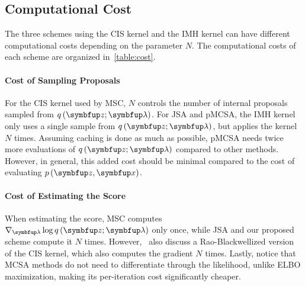 \begin{wraptable}{r}{0.55\textwidth}
  \centering
  \vspace{-0.5in}
  
  \vspace{-0.2in}
\end{wraptable}
%
\vspace{-0.05in}
\subsection{Computational Cost}
\vspace{-0.05in}
The three schemes using the CIS kernel and the IMH kernel can have different computational costs depending on the parameter \(N\).
The computational costs of each scheme are organized in~\cref{table:cost}.

\vspace{-0.1in}
\paragraph{Cost of Sampling Proposals}
For the CIS kernel used by MSC, \(N\) controls the number of internal proposals sampled from \(q\,(\vz; \vlambda)\).
For JSA and pMCSA, the IMH kernel only uses a single sample from \(q\,(\vz; \vlambda)\), but applies the kernel \(N\) times.
Assuming caching is done as much as possible, pMCSA needs twice more evaluations of \(q\,(\vz; \vlambda)\) compared to other methods.
However, in general, this added cost should be minimal compared to the cost of evaluating \(p\,(\vz,\vx)\).

\vspace{-0.1in}
\paragraph{Cost of Estimating the Score}
When estimating the score, MSC computes \(\nabla_{\vlambda} \log q\,(\vz; \vlambda)\) only once, while JSA and our proposed scheme compute it \(N\) times.
However,~\cite{NEURIPS2020_b2070693} also discuss a Rao-Blackwellized version of the CIS kernel, which also computes the gradient \(N\) times.
Lastly, notice that MCSA methods do not need to differentiate through the likelihood, unlike ELBO maximization, making its per-iteration cost significantly cheaper.

